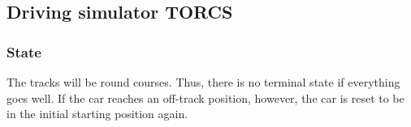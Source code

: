 
\subsection{Driving simulator TORCS}

\subsubsection{State}


The tracks will be round courses. Thus, there is no terminal state if everything goes well. If the car reaches an off-track position, however, the car is reset to be in the initial starting position again.\\

